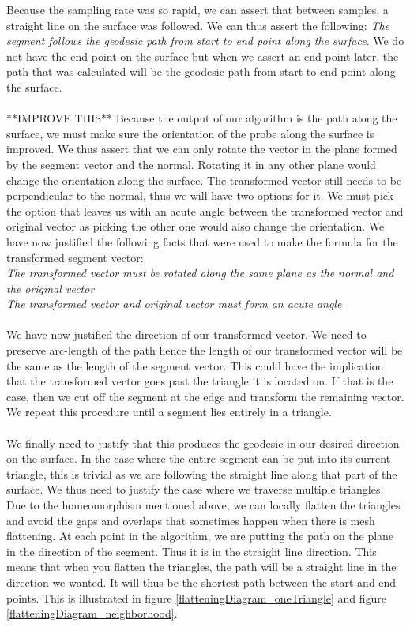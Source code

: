 \documentclass[conference]{acmsiggraph}
\begin{document}
Because the sampling rate was so rapid, we can assert that between samples, a straight line on the surface was followed. We can thus assert the following: {\it The segment follows the geodesic path from start to end point along the surface}. We do not have the end point on the surface but when we assert an end point later, the path that was calculated will be the geodesic path from start to end point along the surface. \\
\\
**IMPROVE THIS** Because the output of our algorithm is the path along the surface, we must make sure the orientation of the probe along the surface is improved. We thus assert that we can only rotate the vector in the plane formed by the segment vector and the normal. Rotating it in any other plane would change the orientation along the surface. The transformed vector still needs to be perpendicular to the normal, thus we will have two options for it. We must pick the option that leaves us with an acute angle between the transformed vector and original vector as picking the other one would also change the orientation. We have now justified the following facts that were used to make the formula for the transformed segment vector: \\
{\it The transformed vector must be rotated along the same plane as the normal and the original vector}\\
{\it The transformed vector and original vector must form an acute angle}
\\
\\
We have now justified the direction of our transformed vector. We need to preserve arc-length of the path hence the length of our transformed vector will be the same as the length of the segment vector. This could have the implication that the transformed vector goes past the triangle it is located on. If that is the case, then we cut off the segment at the edge and transform the remaining vector. We repeat this procedure until a segment lies entirely in a triangle. \\
\\
We finally need to justify that this produces the geodesic in our desired direction on the surface. In the case where the entire segment can be put into its current triangle, this is trivial as we are following the straight line along that part of the surface. We thus need to justify the case where we traverse multiple triangles. Due to the homeomorphism mentioned above, we can locally flatten the triangles and avoid the gaps and overlaps that sometimes happen when there is mesh flattening. At each point in the algorithm, we are putting the path on the plane in the direction of the segment. Thus it is in the straight line direction. This means that when you flatten the triangles, the path will be a straight line in the direction we wanted. It will thus be the shortest path between the start and end points. This is illustrated in figure \ref{flatteningDiagram_oneTriangle} and figure \ref{flatteningDiagram_neighborhood}. 







\end{document}
